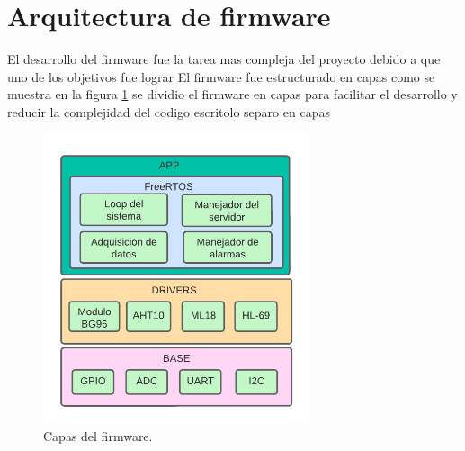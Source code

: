 \section{Arquitectura de firmware}
El desarrollo del firmware fue la tarea mas compleja del proyecto debido a que uno de los objetivos fue lograr 
El firmware fue estructurado en capas como se muestra en la figura \ref{fig:Capas del firmware} se dividio el firmware en capas para facilitar el desarrollo y reducir la complejidad del codigo escritolo separo en capas 

\begin{figure}[htbp]
  \centering
	\includegraphics[width=0.7\textwidth]{./Figures/Capas del firmware.png}
	\caption{Capas del firmware.}
	\label{fig:Capas del firmware}
\end{figure}

